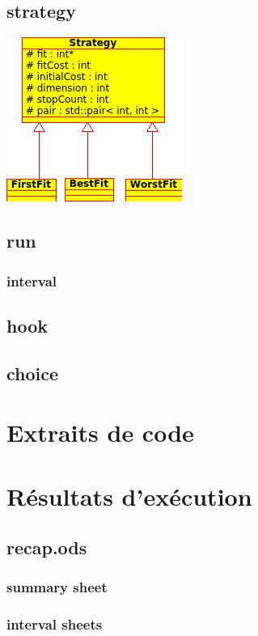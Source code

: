\documentclass[a4paper,10pt]{report}
\begin{document}
\section{strategy}
\includegraphics[width=\textwidth]{../UML/strategy-simple.png}

\section{run}

\subsection{interval}

\section{hook}

\section{choice}

\chapter{Extraits de code}

\chapter{Résultats d'exécution}

\section{recap.ods}
\subsection{summary sheet}


\subsection{interval sheets}

\end{document}
